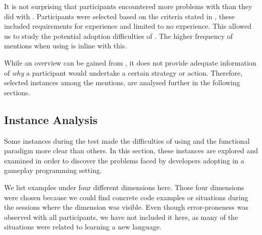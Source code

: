 It is not surprising that participants encountered more problems with \fs than they did with \cs. Participants were selected based on the criteria stated in , these included requirements for \cs experience and limited to no  \fs experience. This allowed us to study the potential adoption difficulties of \fs. The higher frequency of mentions when using \fs is inline with this.

While an overview can be gained from , it does not provide adequate information of \textit{why} a participant would undertake a certain strategy or action. Therefore, selected instances among the mentions, are analysed further in the following sections.

\subsection{Instance Analysis}
Some instances during the test made the difficulties of using \fs and the functional paradigm more clear than others. In this section, these instances are explored and examined in order to discover the problems faced by developers adopting \fs in a gameplay programming setting.

We list examples under four different dimensions here. Those four dimensions were chosen because we could find concrete code examples or situations during the sessions where the dimension was visible. Even though error-proneness was observed with all participants, we have not included it here, as many of the situations were related to learning a new language.






